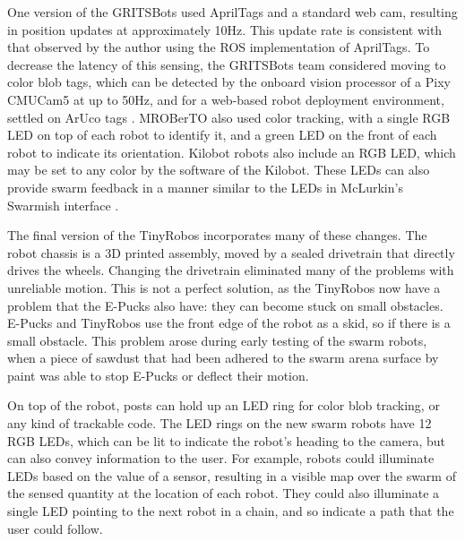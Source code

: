 One version of the GRITSBots used AprilTags and a standard web cam, resulting in position updates at approximately 10Hz. 
This update rate is consistent with that observed by the author using the ROS implementation of AprilTags. 
To decrease the latency of this sensing, the GRITSBots team considered moving to color blob tags, which can be detected by the onboard vision processor of a Pixy CMUCam5 at up to 50Hz, and for a web-based robot deployment environment, settled on ArUco tags \citep{PickemGrits2014, pickem2017robotarium}. 
MROBerTO also used color tracking, with a single RGB LED on top of each robot to identify it, and a green LED on the front of each robot to indicate its orientation. 
Kilobot robots also include an RGB LED, which may be set to any color by the software of the Kilobot. 
These LEDs can also provide swarm feedback in a manner similar to the LEDs in McLurkin's Swarmish interface \citep{mclurkin2006speaking}.

The final version of the TinyRobos incorporates many of these changes. 
The robot chassis is a 3D printed assembly, moved by a sealed drivetrain that directly drives the wheels. 
Changing the drivetrain eliminated many of the problems with unreliable motion. 
This is not a perfect solution, as the TinyRobos now have a problem that the E-Pucks also have: they can become stuck on small obstacles. 
E-Pucks and TinyRobos use the front edge of the robot as a skid, so if there is a small obstacle. 
This problem arose during early testing of the swarm robots, when a piece of sawdust that had been adhered to the swarm arena surface by paint was able to stop E-Pucks or deflect their motion. 

On top of the robot, posts can hold up an LED ring for color blob tracking, or any kind of trackable code. 
The LED rings on the new swarm robots have 12 RGB LEDs, which can be lit to indicate the robot's heading to the camera, but can also convey information to the user. 
For example, robots could illuminate LEDs based on the value of a sensor, resulting in a visible map over the swarm of the sensed quantity at the location of each robot. 
They could also illuminate a single LED pointing to the next robot in a chain, and so indicate a path that the user could follow.

